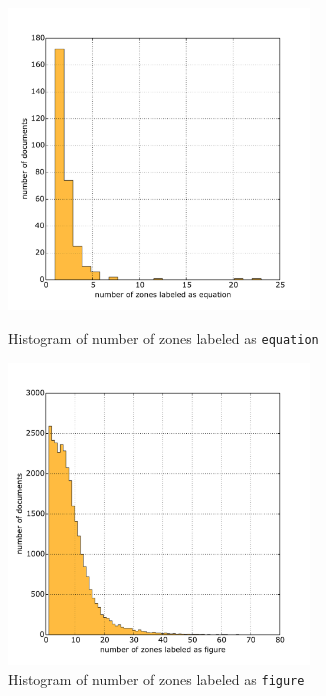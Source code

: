 \begin{appendix}
  \begin{figure}
\centering
\begin{minipage}[t!]{0.48\linewidth}
  \includegraphics[width=8cm]{plots/equation_histogram}
  \caption{Histogram of number of zones labeled as \texttt{equation}}
  \label{fig:equation_histogram}
\end{minipage}
\quad
\begin{minipage}[t!]{0.48\linewidth}
  \includegraphics[width=8cm]{plots/figure_histogram}
  \caption{Histogram of number of zones labeled as \texttt{figure}}
  \label{fig:figure_histogram}
\end{minipage}
\end{figure}


\end{appendix}
